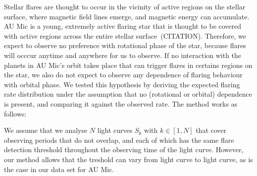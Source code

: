 \documentclass[fleqn,usenatbib,letters]{mnras}%
\begin{document}
Stellar flares are thought to occur in the vicinity of active regions on the stellar surface, where magnetic field lines emerge, and magnetic energy can accumulate. AU Mic is a young, extremely active flaring star that is thought to be covered with active regions across the entire stellar surface~(CITATION). Therefore, we expect to observe no preference with rotational phase of the star, because flares will occcur anytime and anywhere for us to observe. If no interaction with the planets in AU Mic's orbit takes place that can trigger flares in certains regions on the star, we also do not expect to observe any dependence of flaring behaviour with orbital phase. We tested this hypothesis by deriving the expected flaring rate distribution under the assumption that no (rotational or orbital) dependence is present, and comparing it against the observed rate. The method works as follows:

We assume that we analyse $N$ light curves $S_k$ with $k\in [1,N]$ that cover observing periods that do not overlap, and each of which has the same flare detection threshold throughout the observing time of the light curve. However, our method allows that the treshold can vary from light curve to light curve, as is the case in our data set for AU Mic.
 
\end{document}
